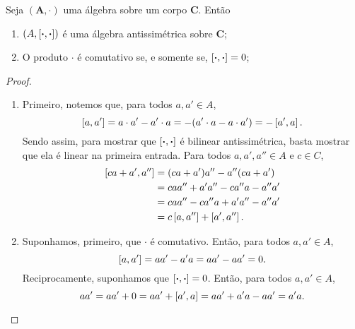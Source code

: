 \begin{proposition}
Seja $(\bm A,\cdot)$ uma álgebra sobre um corpo $\bm C$. Então
	\begin{enumerate}
	\item $(A,\left[{\bm{\cdot}},{\bm{\cdot}}\right])$ é uma álgebra antissimétrica sobre $\bm C$;
	\item O produto $\cdot$ é comutativo se, e somente se, $\left[{\bm{\cdot}},{\bm{\cdot}}\right] = 0$;
	\end{enumerate}
\end{proposition}
\begin{proof}
	\begin{enumerate}
	\item Primeiro, notemos que, para todos $a,a' \in A$,
		\begin{equation*}
		\left[{a},{a'}\right] = a \cdot a' - a' \cdot a = -(a' \cdot a - a \cdot a') = -\left[{a'},{a}\right].
		\end{equation*}	
Sendo assim, para mostrar que $\left[{\bm{\cdot}},{\bm{\cdot}}\right]$ é bilinear antissimétrica, basta mostrar que ela é linear na primeira entrada. Para todos $a,a',a'' \in A$ e $c \in C$,
		\begin{align*}
		\left[{ca+a'},{a''}\right] &= (ca+a')a'' - a''(ca+a') \\
			&= caa'' + a'a'' - ca''a - a''a' \\
			&= caa'' - ca''a + a'a'' - a''a' \\
			&= c\left[{a},{a''}\right] + \left[{a'},{a''}\right].
		\end{align*}

	\item Suponhamos, primeiro, que $\cdot$ é comutativo. Então, para todos $a,a' \in A$,
		\begin{equation*}
		\left[{a},{a'}\right] = aa' - a'a = aa' - aa' = 0.
		\end{equation*}
Reciprocamente, suponhamos que $\left[{\bm{\cdot}},{\bm{\cdot}}\right]=0$. Então, para todos $a,a' \in A$,
		\begin{equation*}
		aa' = aa' + 0 = aa' + \left[{a'},{a}\right] = aa' + a'a - aa' = a'a.
		\qedhere
		\end{equation*}


\end{enumerate}
\end{proof}
